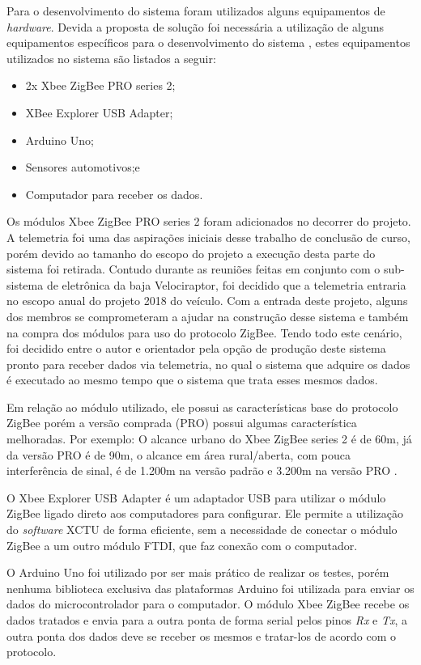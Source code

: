 Para o desenvolvimento do sistema foram utilizados alguns equipamentos de \textit{hardware}. Devida a proposta de solução foi necessária a utilização de alguns equipamentos específicos para o desenvolvimento do sistema , estes equipamentos utilizados no sistema são listados a seguir:

\begin{itemize}
	\item 2x Xbee ZigBee PRO series 2;
	\item XBee Explorer USB Adapter;
	\item Arduino Uno;
	\item Sensores automotivos;e
	\item Computador para receber os dados. 
\end{itemize}  

Os módulos Xbee ZigBee PRO series 2 foram adicionados no decorrer do projeto. A telemetria foi uma das aspirações iniciais desse trabalho de conclusão de curso, porém devido ao tamanho do escopo do projeto a execução desta parte do sistema foi retirada. Contudo durante as reuniões feitas em conjunto com o sub-sistema de eletrônica da baja Velociraptor, foi decidido que a telemetria entraria no escopo anual do projeto 2018 do veículo. Com a entrada deste projeto, alguns dos membros se comprometeram a ajudar na construção desse sistema e também na compra dos módulos para uso do protocolo ZigBee. Tendo todo este cenário, foi decidido entre o autor e orientador pela opção de produção deste sistema pronto para receber dados via telemetria, no qual o sistema que adquire os dados é executado ao mesmo tempo que o sistema que trata esses mesmos dados. 

Em relação ao módulo utilizado, ele possui as características base do protocolo ZigBee porém a versão comprada (PRO) possui algumas característica melhoradas. Por exemplo: O alcance urbano do Xbee ZigBee series 2 é de 60m, já da versão PRO é de 90m, o alcance em área rural/aberta, com pouca interferência de sinal, é de 1.200m na versão padrão e 3.200m na versão PRO \cite{xbeespecs}.

O Xbee Explorer USB Adapter é um adaptador USB para utilizar o módulo ZigBee ligado direto aos computadores para configurar. Ele permite a utilização do \textit{software} XCTU de forma eficiente, sem a necessidade de conectar o módulo ZigBee a um outro módulo FTDI, que faz conexão com o computador. 

O Arduino Uno foi utilizado por ser mais prático de realizar os testes, porém nenhuma biblioteca exclusiva das plataformas Arduino foi utilizada para enviar os dados do microcontrolador para o computador. O módulo Xbee ZigBee recebe os dados tratados e envia para a outra ponta de forma serial pelos pinos \textit{Rx} e \textit{Tx}, a outra ponta dos dados deve se receber os mesmos e tratar-los de acordo com o protocolo.

